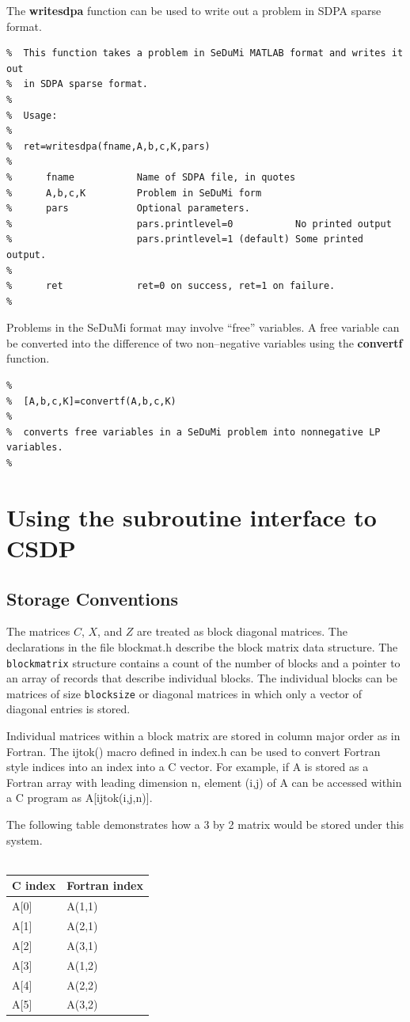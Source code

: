 \documentclass{article}
\begin{document}
The {\bf writesdpa} function can be used to write out a problem in SDPA
sparse format.

\begin{verbatim}
%  This function takes a problem in SeDuMi MATLAB format and writes it out 
%  in SDPA sparse format.  
%
%  Usage:
%
%  ret=writesdpa(fname,A,b,c,K,pars)
%
%      fname           Name of SDPA file, in quotes
%      A,b,c,K         Problem in SeDuMi form
%      pars            Optional parameters.
%                      pars.printlevel=0           No printed output  
%                      pars.printlevel=1 (default) Some printed output.
%      
%      ret             ret=0 on success, ret=1 on failure.
%
\end{verbatim}

Problems in the SeDuMi format may involve ``free'' variables.  A free variable
can be converted into the difference of two non--negative variables using the
{\bf convertf} function.

\begin{verbatim}
% 
%  [A,b,c,K]=convertf(A,b,c,K)
% 
%  converts free variables in a SeDuMi problem into nonnegative LP variables.
% 
\end{verbatim}
\section*{Using the subroutine interface to CSDP}
\subsection*{Storage Conventions}
The matrices $C$, $X$, and $Z$ are treated as block diagonal matrices.
The declarations in the file blockmat.h describe the block matrix
data structure.  The {\tt blockmatrix} structure contains a count of
the number of blocks and a pointer to an array of records that 
describe individual blocks.  The individual blocks can be matrices
of size {\tt blocksize} or diagonal matrices in which only a vector
of diagonal entries is stored.  

Individual matrices within a block matrix are stored in column major
order as in Fortran.  The ijtok() macro defined in index.h can be used
to convert Fortran style indices into an index into a C vector.  For
example, if A is stored as a Fortran array with leading dimension
n, element (i,j) of A can be accessed within a C program as
A[ijtok(i,j,n)].

The following table  demonstrates how a 3 by 2 matrix would
be stored under this system.  
\\
\\
\begin{tabular}{|l|l|} \hline
C index & Fortran index \\ \hline
A[0] & A(1,1) \\ \hline
A[1] & A(2,1) \\ \hline
A[2] & A(3,1) \\ \hline
A[3] & A(1,2) \\ \hline
A[4] & A(2,2) \\ \hline
A[5] & A(3,2) \\ \hline
\end{tabular}
\end{document}
